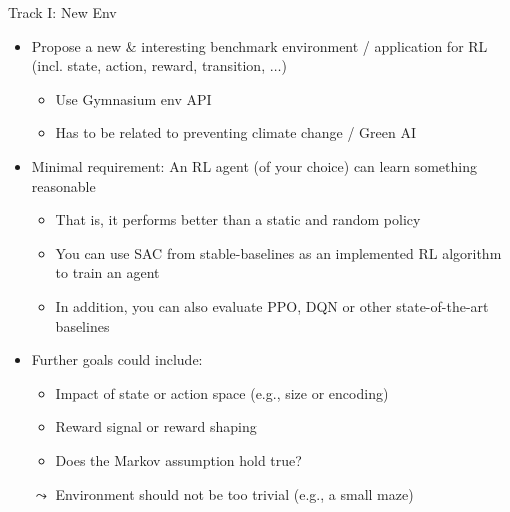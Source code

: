 \documentclass[aspectratio=169]{../latex_main/tntbeamer}  %
\begin{document}
\begin{frame}[c]{Track I: New Env}
	
	\begin{itemize}
		\item Propose a new \& interesting benchmark environment / application for RL (incl. state, action, reward, transition, $\ldots$)
		\begin{itemize}
			\item Use Gymnasium env API
			\item \alert{Has to be related to preventing climate change / Green AI}
		\end{itemize}
		\item Minimal requirement: An RL agent (of your choice) can learn something reasonable
		\begin{itemize}
			\item That is, it performs better than a static and random policy
			\item You can use SAC from stable-baselines as an implemented RL algorithm to train an agent
			\item In addition, you can also evaluate PPO, DQN or other state-of-the-art baselines
		\end{itemize}
		\item Further goals could include:
		\begin{itemize}
			\item Impact of state or action space (e.g., size or encoding)
			\item Reward signal or reward shaping
			\item Does the Markov assumption hold true?
		\end{itemize}
		\item[$\leadsto$] Environment should not be too trivial (e.g., a small maze)
	\end{itemize}
	
\end{frame}
\end{document}

